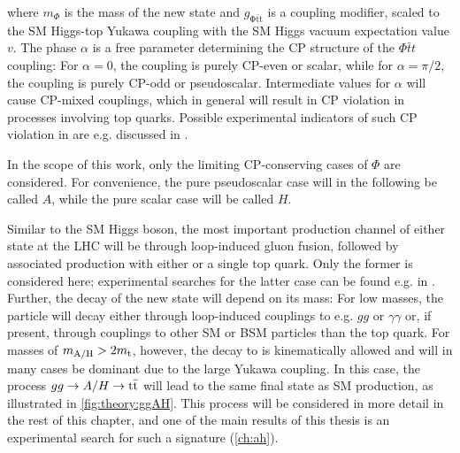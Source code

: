 \noindent where $m_\Phi$ is the mass of the new state and $g_{\mathrm{\Phi \bar{t} t}}$ is a coupling modifier, scaled to the SM Higgs-top Yukawa coupling with the SM Higgs vacuum expectation value $v$. The phase $\alpha$ is a free parameter determining the CP structure of the $\Phi \bar{t} t$ coupling: For $\alpha = 0$, the coupling is purely CP-even or scalar, while for $\alpha = \pi/2$, the coupling is purely CP-odd or pseudoscalar. Intermediate values for $\alpha$ will cause CP-mixed couplings, which in general will result in  CP violation in processes involving top quarks. Possible experimental indicators of such CP violation in \pptt are e.g. discussed in .

In the scope of this work, only the limiting CP-conserving cases of $\Phi$ are considered. For convenience, the pure pseudoscalar case will in the following be called $A$, while the pure scalar case will be called $H$.

Similar to the SM Higgs boson, the most important production channel of either state at the LHC will be through loop-induced gluon fusion, followed by associated production with either \ttbar or a single top quark. Only the former is considered here; experimental searches for the latter case can be found e.g. in . Further, the decay of the new state will depend on its mass: For low masses, the particle will decay either through loop-induced couplings to e.g. $gg$ or $\gamma \gamma$ or, if present, through couplings to other SM or BSM particles than the top quark. For masses of $m_{\mathrm{A/H}} > 2 m_{\mathrm{t}}$, however, the decay to \ttbar is kinematically allowed and will in many cases be dominant due to the large Yukawa coupling. In this case, the process $gg \rightarrow A/H \rightarrow \mathrm{t \bar{t}}$ will lead to the same final state as SM \ttbar production, as illustrated in \cref{fig:theory:ggAH}. This process will be considered in more detail in the rest of this chapter, and one of the main results of this thesis is an experimental search for such a signature (\cref{ch:ah}).

